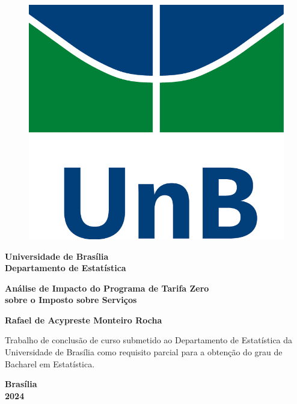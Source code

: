 \documentclass[12pt, a4paper, twoside]{article}
\numberwithin{equation}{subsection} %
\newcommand{\titulo}{Análise de Impacto do Programa de Tarifa
Zero \\ sobre o Imposto sobre Serviços}
\newcommand{\autor}{Rafael de Acypreste Monteiro Rocha}
\begin{document}
\begin{titlepage}
\begin{center}
\begin{figure}[h!]
	\centering
		\includegraphics[scale = 0.6]{img/as_vert_cor.jpg}
	\label{fig:unb}
\end{figure}
{\bf Universidade de Brasília \\
\bf Departamento de Estatística}
\vspace{4cm}

\setcounter{page}{0}
\null
\textbf{\titulo}
\vspace{2.5cm}


\vspace{0.2cm}
\textbf{\autor}
\end{center}
\vspace{1.5cm}

\begin{flushright}
\begin{minipage}{7.5cm}
\parbox[t]{7.5cm}{Trabalho de conclusão de curso submetido ao
Departamento de Estatística da Universidade de Brasília como requisito
parcial para a obtenção do grau de Bacharel em Estatística.}
\end{minipage}
\end{flushright}

\vspace{5cm}

\begin{center}
{\bf{Brasília} \\ }
\bf{2024}
\end{center}
\end{titlepage}
\end{document}
